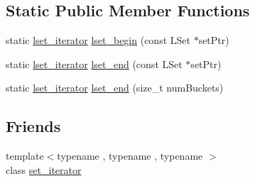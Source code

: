 \subsection*{Static Public Member Functions}
\begin{DoxyCompactItemize}
\item 
static \hyperlink{classshad_1_1lset__iterator}{lset\-\_\-iterator} \hyperlink{classshad_1_1lset__iterator_a388c04d5bf67867300e9cbb0cacbccc4}{lset\-\_\-begin} (const L\-Set $\ast$set\-Ptr)
\item 
static \hyperlink{classshad_1_1lset__iterator}{lset\-\_\-iterator} \hyperlink{classshad_1_1lset__iterator_a4a7319398bbdb69035630c4278f1f07f}{lset\-\_\-end} (const L\-Set $\ast$set\-Ptr)
\item 
static \hyperlink{classshad_1_1lset__iterator}{lset\-\_\-iterator} \hyperlink{classshad_1_1lset__iterator_a1d29fcaa8072432b0f67f9a343e36d95}{lset\-\_\-end} (size\-\_\-t num\-Buckets)
\end{DoxyCompactItemize}
\subsection*{Friends}
\begin{DoxyCompactItemize}
\item 
{\footnotesize template$<$typename , typename , typename $>$ }\\class \hyperlink{classshad_1_1lset__iterator_a51032913d89093f66aa9219f72afe821}{set\-\_\-iterator}
\end{DoxyCompactItemize}


